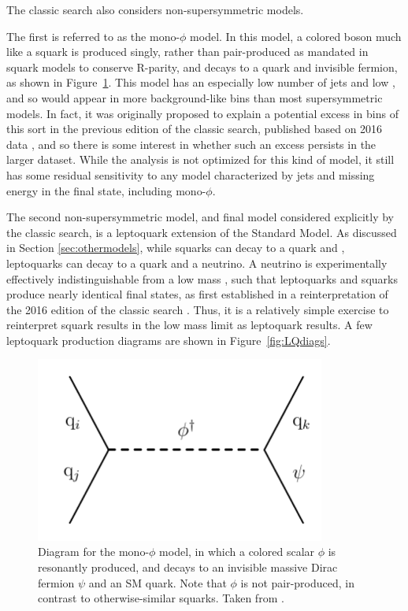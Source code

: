     The classic search also considers non-supersymmetric models.

    The first is referred to as the mono-$\phi$ model.
    In this model, a colored boson much like a squark is produced singly, rather than pair-produced as mandated in squark models to conserve R-parity, and decays to a quark and invisible fermion, as shown in Figure~\ref{fig:monophidiag}.
    This model has an especially low number of jets and low \mttwo, and so would appear in more background-like bins than most supersymmetric models.
    In fact, it was originally proposed \cite{monophi} to explain a potential excess in bins of this sort in the previous edition of the classic search, published based on 2016 data \cite{MT2_2016}, and so there is some interest in whether such an excess persists in the larger dataset.
    While the analysis is not optimized for this kind of model, it still has some residual sensitivity to any model characterized by jets and missing energy in the final state, including mono-$\phi$.

    The second non-supersymmetric model, and final model considered explicitly by the classic search, is a leptoquark extension of the Standard Model.
    As discussed in Section \ref{sec:othermodels}, while squarks can decay to a quark and \lsp, leptoquarks can decay to a quark and a neutrino.
    A neutrino is experimentally effectively indistinguishable from a low mass \lsp, such that leptoquarks and squarks produce nearly identical final states, as first established in a reinterpretation of the 2016 edition of the classic search \cite{LQ2016}.
    Thus, it is a relatively simple exercise to reinterpret squark results in the low mass \lsp limit as leptoquark results.
    A few leptoquark production diagrams are shown in Figure~\ref{fig:LQdiags}.

  \begin{figure}[h!]
    \centering
    \includegraphics[width=0.85\textwidth]{figures/MT2_2019/Figure_008.pdf}
    \caption[Diagram for the mono-$\phi$ model.]{Diagram for the mono-$\phi$ model, in which a colored scalar $\phi$ is resonantly produced, and decays to an invisible massive Dirac fermion $\psi$ and an SM quark. Note that $\phi$ is not pair-produced, in contrast to otherwise-similar squarks. Taken from \cite{MT2_2019}.}
    \label{fig:monophidiag}
  \end{figure}  

